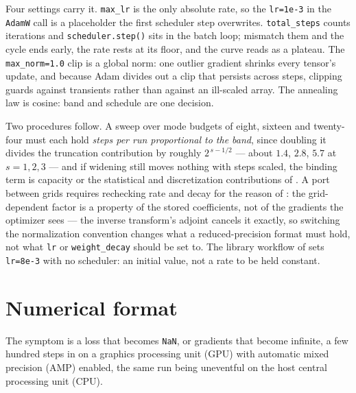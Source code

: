 Four settings carry it. \texttt{max\_lr} is the only absolute rate, so the
\texttt{lr=1e-3} in the \texttt{AdamW} call is a placeholder the first scheduler step
overwrites. \texttt{total\_steps} counts iterations and \texttt{scheduler.step()}
sits in the batch loop; mismatch them and the cycle ends early, the rate rests at
its floor, and the curve reads as a plateau. The \texttt{max\_norm=1.0} clip is a
global norm: one outlier gradient shrinks every tensor's update, and because Adam
divides out a clip that persists across steps, clipping guards against transients
rather than against an ill-scaled array. The annealing
law is cosine: band and schedule are one decision.

Two procedures follow. A sweep over mode budgets of eight, sixteen and twenty-four
must each hold \emph{steps per run proportional to the band}, since doubling it divides
the truncation contribution by roughly $2^{\,s-1/2}$ --- about $1.4$, $2.8$, $5.7$
at $s=1,2,3$ --- and if widening still moves nothing with steps scaled, the binding
term is capacity or the statistical and discretization contributions of
\cite{subedi2024controlling}. A port between grids requires rechecking rate and
decay for the reason of :
the grid-dependent factor is a property of the stored coefficients, not of the
gradients the optimizer sees --- the inverse transform's adjoint cancels it exactly,
so switching the normalization convention changes what a reduced-precision format
must hold, not what \texttt{lr} or \texttt{weight\_decay} should be set to. The library workflow of
 sets \texttt{lr=8e-3}
with no scheduler: an initial value, not a rate to be held constant.

\section{Numerical format}
\label{sec:appd-precision}

The symptom is a loss that becomes \texttt{NaN}, or gradients that become infinite,
a few hundred steps in on a graphics processing unit (GPU) with automatic mixed
precision (AMP) enabled, the same run being uneventful on the host central
processing unit (CPU).

